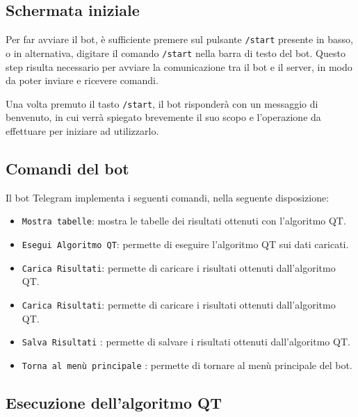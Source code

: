 \subsection{Schermata iniziale}

Per far avviare il bot, è sufficiente premere sul pulsante \texttt{/start} presente in basso, o in alternativa, digitare il comando \texttt{/start} nella barra di testo del bot. Questo step risulta necessario per avviare la comunicazione tra il bot e il server, in modo da poter inviare e ricevere comandi.


Una volta premuto il tasto \texttt{/start}, il bot risponderà con un messaggio di benvenuto, in cui verrà spiegato brevemente il suo scopo e l'operazione da effettuare per iniziare ad utilizzarlo.

\label{Schermata iniziale}

\subsection{Comandi del bot}

Il bot Telegram implementa i seguenti comandi, nella seguente disposizione:

\begin{multicols}{2}
        \begin{itemize}
            \item \texttt{Mostra tabelle}: mostra le tabelle dei risultati ottenuti con l'algoritmo QT.
            \item \texttt{Esegui Algoritmo QT}: permette di eseguire l'algoritmo QT sui dati caricati.
            \item \texttt{Carica Risultati}: permette di caricare i risultati ottenuti dall'algoritmo QT.
            \item \texttt{Carica Risultati}: permette di caricare i risultati ottenuti dall'algoritmo QT.
            \item \texttt{Salva Risultati} : permette di salvare i risultati ottenuti dall'algoritmo QT.
            \item \texttt{Torna al menù principale} :   permette di tornare al menù principale del bot.
        \end{itemize}
\end{multicols}

\subsection{Esecuzione dell'algoritmo QT}

